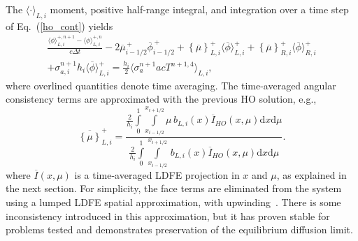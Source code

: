 \documentclass{anstrans}
\renewcommand{\eqref}[1]{(\ref{#1})}
\renewcommand{\d}{\mathrm{d}}
\newcommand{\mom}[1]{\langle #1 \rangle}
\newcommand{\xl}{{x_{i-1/2}}}
\newcommand{\xr}{{x_{i+1/2}}}
\newcommand{\phibar}{\ensuremath{\overline{\phi}}}
\newcommand{\cur}[1]{\left\{ #1 \right\}}
\begin{document}
The $\mom{\cdot}_{L,i}$ moment, positive half-range integral, and
integration over a time step of Eq.~\eqref{ho_cont} yields
\begin{multline}\label{eq:t_moml_ex}
    \frac{\mom{\phi}_{L,i}^{+,n+1} - \mom{\phi}_{L,i}^{+,n}}{c \Delta t}
    -2\overline {\mu}_{i-1/2}^{\,+} \overline \phi_{i-1/2}^{\,+} + {\cur {\overline\mu}}_{L,i}^{+}
  \mom{\phibar}_{L,i}^{+}
  +  \cur{\overline\mu}_{R,i}^{+}
  \mom{\phibar}_{R,i}^{+} \\ +  \sigma_{a,i}^{n+1} h_i 
  \mom{\overline\phi}_{L,i}^{+}   = \frac{h_i}{2} \mom{\sigma_a^{n+1} a c T^{n+1,4}}_{L,i},
\end{multline}
where overlined quantities denote time averaging.  The time-averaged angular consistency
terms are approximated with the previous HO solution, e.g.,
\begin{equation}\label{const}
    \overline{\cur{{\mu}}}_{L,i}^+ =  \frac{
        {\displaystyle \frac{2}{h_i}} \int\limits_0^1 \int\limits_\xl^\xr \mu \, b_{L,i}(x)
        \overline{I}_{HO}(x,\mu) \d x \d \mu } 
{{\displaystyle \frac{2}{h_i}} \int\limits_0^1 \int\limits_\xl^\xr \, b_{L,i}(x)
\overline{I}_{HO}(x,\mu) \d x \d \mu } .
\end{equation}
where $\overline{I}(x,\mu)$ is a time-averaged LDFE projection in $x$ and $\mu$, as
explained in the next section.  For simplicity, the face terms are eliminated from the
system using a lumped LDFE
spatial approximation, with upwinding~\cite{bolding_nse}.  There is some inconsistency introduced in this approximation, but
it has proven stable for problems tested and demonstrates preservation of the equilibrium diffusion
limit.
\end{document}
